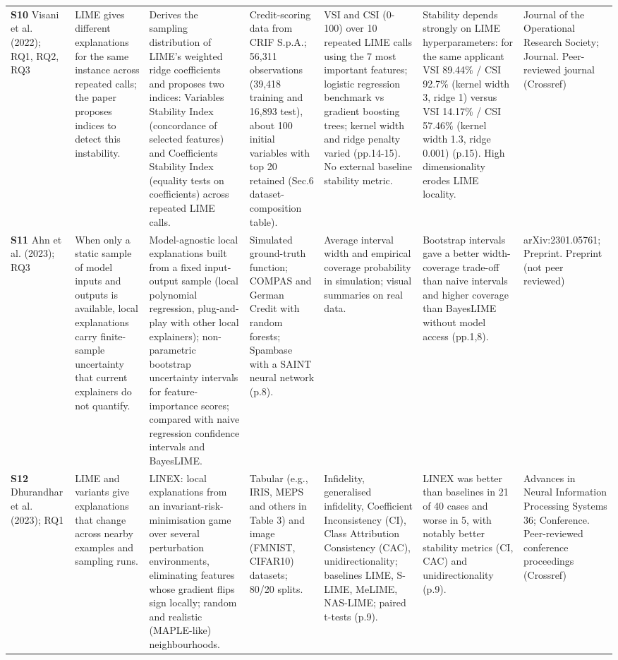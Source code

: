 \begin{longtable}{@{}P{1.55cm}P{2.9cm}P{4.5cm}P{3.2cm}P{3.4cm}P{4.6cm}P{3.6cm}@{}}
\textbf{S10} \cite{S10} Visani et al. (2022); RQ1, RQ2, RQ3 & LIME gives different explanations for the same instance across repeated calls; the paper proposes indices to detect this instability. & Derives the sampling distribution of LIME's weighted ridge coefficients and proposes two indices: Variables Stability Index (concordance of selected features) and Coefficients Stability Index (equality tests on coefficients) across repeated LIME calls. & Credit-scoring data from CRIF S.p.A.; 56,311 observations (39,418 training and 16,893 test), about 100 initial variables with top 20 retained (Sec.6 dataset-composition table). & VSI and CSI (0-100) over 10 repeated LIME calls using the 7 most important features; logistic regression benchmark vs gradient boosting trees; kernel width and ridge penalty varied (pp.14-15). No external baseline stability metric. & Stability depends strongly on LIME hyperparameters: for the same applicant VSI 89.44\% /\allowbreak{} CSI 92.7\% (kernel width 3, ridge 1) versus VSI 14.17\% /\allowbreak{} CSI 57.46\% (kernel width 1.3, ridge 0.001) (p.15). High dimensionality erodes LIME locality. & Journal of the Operational Research Society; Journal. Peer-reviewed journal (Crossref) \\
\textbf{S11} \cite{S11} Ahn et al. (2023); RQ3 & When only a static sample of model inputs and outputs is available, local explanations carry finite-sample uncertainty that current explainers do not quantify. & Model-agnostic local explanations built from a fixed input-output sample (local polynomial regression, plug-and-play with other local explainers); non-parametric bootstrap uncertainty intervals for feature-importance scores; compared with naive regression confidence intervals and BayesLIME. & Simulated ground-truth function; COMPAS and German Credit with random forests; Spambase with a SAINT neural network (p.8). & Average interval width and empirical coverage probability in simulation; visual summaries on real data. & Bootstrap intervals gave a better width-coverage trade-off than naive intervals and higher coverage than BayesLIME without model access (pp.1,8). & arXiv:2301.05761; Preprint. Preprint (not peer reviewed) \\
\textbf{S12} \cite{S12} Dhurandhar et al. (2023); RQ1 & LIME and variants give explanations that change across nearby examples and sampling runs. & LINEX: local explanations from an invariant-risk-minimisation game over several perturbation environments, eliminating features whose gradient flips sign locally; random and realistic (MAPLE-like) neighbourhoods. & Tabular (e.g., IRIS, MEPS and others in Table 3) and image (FMNIST, CIFAR10) datasets; 80/\allowbreak{}20 splits. & Infidelity, generalised infidelity, Coefficient Inconsistency (CI), Class Attribution Consistency (CAC), unidirectionality; baselines LIME, S-LIME, MeLIME, NAS-LIME; paired t-tests (p.9). & LINEX was better than baselines in 21 of 40 cases and worse in 5, with notably better stability metrics (CI, CAC) and unidirectionality (p.9). & Advances in Neural Information Processing Systems 36; Conference. Peer-reviewed conference proceedings (Crossref) \\

\end{longtable}
